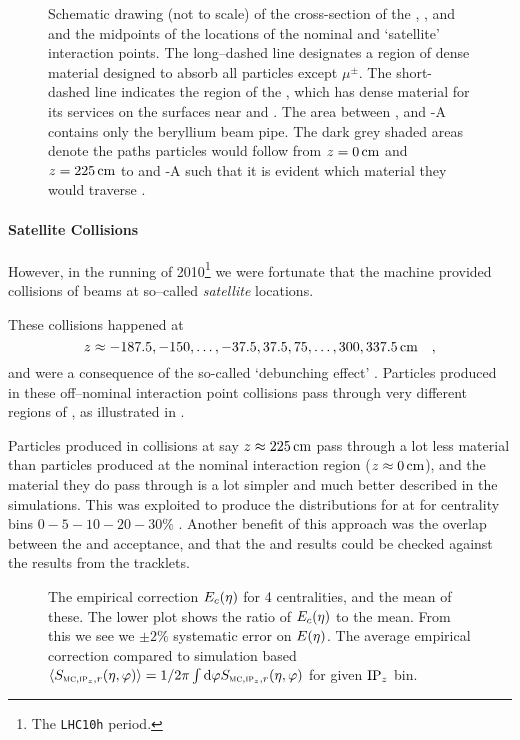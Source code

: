 \begin{figure}[th!bp]
  \centering
  \caption{Schematic drawing (not to scale) of the cross-section of
    the \ITS{}, \FMD{}, and \VZERO{} and the midpoints of the
    locations of the nominal and `satellite' interaction points. The
    long--dashed line designates a region of dense material designed
    to absorb all particles except $\mu^{\pm}$. The short-dashed line
    indicates the region of the \ALICE{} \ITS{}, which has dense
    material for its services on the surfaces near  and
    . The area between ,  and \VZERO{}-A contains
    only the beryllium beam pipe. The dark grey shaded areas denote
    the paths particles would follow from $z=\unit[0]{\text{cm}}$ and
    $z=\unit[225]{\text{cm}}$ to  and \VZERO{}-A such that it
    is evident which material they would traverse
    \cite{Abbas:2013bpa}.}
  \label{fig:satellite_geom}
\end{figure}

\paragraph{Satellite Collisions} 
However, in the \PbPbCol{} running of 2010\footnote{The
  \texttt{LHC10h} period.} we were fortunate that the machine provided
collisions of beams at so--called \emph{satellite} locations.

These collisions happened at
$$
z \approx -187.5, -150, \ldots, -37.5, 37.5, 75, \ldots, 300,
\unit[337.5]{\text{cm}} \quad, 
$$ 
and were a consequence of the so-called `debunching effect'
\cite{maxime}.  Particles produced in these off--nominal interaction
point collisions pass through very different regions of \ALICE{}, as
illustrated in .  

Particles produced in collisions at say
$z\approx\unit[225]{\text{cm}}$ pass through a lot less material than
particles produced at the nominal interaction region
($z\approx\unit[0]{\text{cm}}$), and the material they do pass through
is a lot simpler and much better described in the simulations.  This
was exploited to produce the \ndndeta{} distributions for \PbPbCol{}
at  for centrality bins $0-5-10-20-30\%$
\cite{Abbas:2013bpa}.  Another benefit of this approach was the
overlap between the \FMD{} and \VZERO{} acceptance, and that the
\VZERO{} and \FMD{} results could be checked against the results from
the \SPD{} tracklets.

\begin{figure}[h!tbp]
  \centering
  \caption{ The empirical correction
    $\EmpCor[c]{}$ for 4 centralities, and the mean of these.  The
    lower plot shows the ratio of $\EmpCor[c]{}$ to the mean.  From
    this we see we $\pm2\%$ systematic error on
    $\EmpCor{}$.  The average empirical
    correction compared to simulation based
    $\langle\SecMap\rangle=1/2\pi\int\text{d}\varphi\SecMap{}$ for
    given $\IPz{}$ bin. } 
\end{figure}



